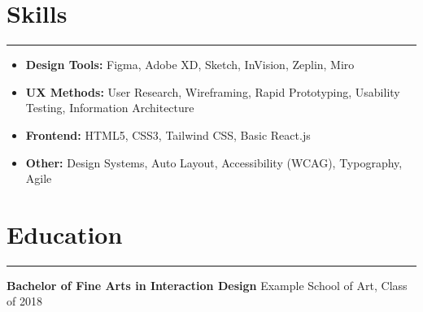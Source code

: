\documentclass[a4paper,10pt]{article}
\begin{document}
\section*{Skills}
\hrule
\vspace{2mm}
\begin{itemize}[leftmargin=*]
    \item \textbf{Design Tools:} Figma, Adobe XD, Sketch, InVision, Zeplin, Miro
    \item \textbf{UX Methods:} User Research, Wireframing, Rapid Prototyping, Usability Testing, Information Architecture
    \item \textbf{Frontend:} HTML5, CSS3, Tailwind CSS, Basic React.js
    \item \textbf{Other:} Design Systems, Auto Layout, Accessibility (WCAG), Typography, Agile
\end{itemize}

\section*{Education}
\hrule
\vspace{2mm}
\noindent \textbf{Bachelor of Fine Arts in Interaction Design} \hfill Example School of Art, Class of 2018
\end{document}
